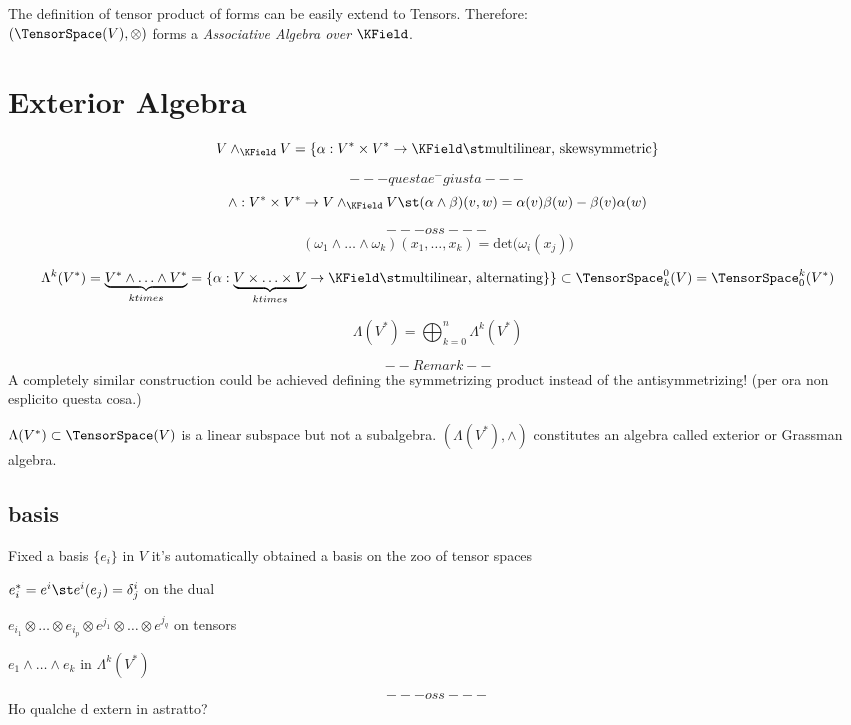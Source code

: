 \documentclass[a4paper,10pt]{scrartcl}
\begin{document}
The definition of tensor product of forms can be easily extend to Tensors. Therefore:\\
$\left( \TensorSpace(V), \otimes \right)$ forms a \emph{Associative Algebra over $\KField$}.


\section{Exterior Algebra}
\begin{displaymath}
 V \wedge_\KField V = \left\{ \alpha: V^\ast \times V^\ast \rightarrow \KField \st \textrm{multilinear, skewsymmetric} \right\}
\end{displaymath}

$$--- questa e^- giusta ---$$
\begin{displaymath}
 \wedge : V^\ast \times V^\ast \rightarrow V \wedge_\KField V  \st (\alpha \wedge \beta ) ( v,w) = \alpha(v) \beta(w) -\beta(v)\alpha(w)
\end{displaymath}



$$--- oss ---$$
\begin{displaymath}
 \left( \omega_1 \wedge \ldots \wedge \omega_k \right) (x_1, \ldots, x_k) = \textrm{det}\big(\omega_i(x_j) \big)
\end{displaymath}



\begin{displaymath}
 \Lambda^k(V^*) = \underbrace{V^\ast \wedge \ldots \wedge V^\ast}_{k times} = \{ \alpha : \underbrace{V \times \ldots \times V}_{k times} \rightarrow \KField \st \textrm{multilinear, alternating}\}
 \} \subset \TensorSpace^0_k(V) = \TensorSpace^k_0(V^\ast)
\end{displaymath}

\begin{displaymath}
 \Lambda(V^*) = \bigoplus_{k=0}^{n} \Lambda^k(V^\ast)
\end{displaymath}


$$-- Remark --$$
A completely similar construction could be achieved defining the symmetrizing product instead of the antisymmetrizing! (per ora non esplicito questa cosa.)

$\Lambda(V^*)\subset \TensorSpace(V) $ is a linear subspace but not a subalgebra. $(\Lambda(V^\ast), \wedge)$ constitutes an algebra called exterior or Grassman algebra.


\subsection{basis}
Fixed a basis $\{e_i\}$ in $V$ it's automatically obtained a basis on the zoo of tensor spaces

$e^\ast_i = e^i \st e^i(e_j) = \delta^i_j $ on the dual

$e_{i_1} \otimes \ldots \otimes e_{i_p} \otimes e^{j_1} \otimes \ldots \otimes e^{j_q}$ on tensors

$e_1 \wedge \ldots \wedge e_k $ in $\Lambda^k(V^*)$


$$--- oss ---$$
Ho qualche d extern in astratto?
\end{document}
